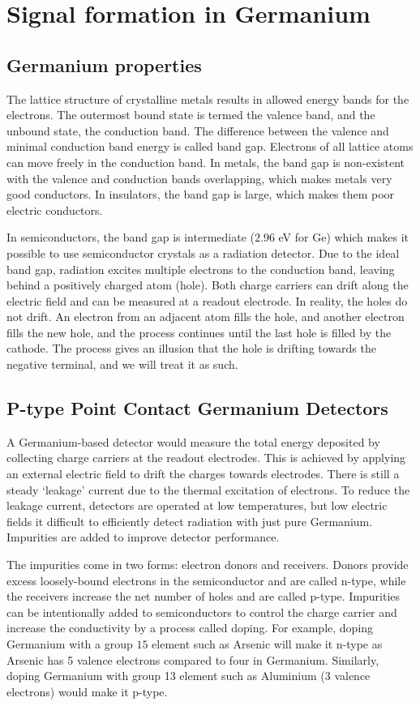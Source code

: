\section{Signal formation in Germanium}
\subsection{Germanium properties}
The lattice structure of crystalline metals results in allowed energy bands for the electrons. The outermost bound state is termed the valence band, and the unbound state, the conduction band. The difference between the valence and minimal conduction band energy is called band gap. Electrons of all lattice atoms can move freely in the conduction band. In metals, the band gap is non-existent with the valence and conduction bands overlapping, which makes metals very good conductors. In insulators, the band gap is large, which makes them poor electric conductors.

In semiconductors, the band gap is intermediate ($2.96$ eV for Ge) which makes it possible to use semiconductor crystals as a radiation detector. Due to the ideal band gap, radiation excites multiple electrons to the conduction band, leaving behind a positively charged atom (hole). Both charge carriers can drift along the electric field and can be measured at a readout electrode. In reality, the holes do not drift. An electron from an adjacent atom fills the hole, and another electron fills the new hole, and the process continues until the last hole is filled by the cathode. The process gives an illusion that the hole is drifting towards the negative terminal, and we will treat it as such.

\subsection{P-type Point Contact Germanium Detectors}
A Germanium-based detector would measure the total energy deposited by collecting charge carriers at the readout electrodes. This is achieved by applying an external electric field to drift the charges towards electrodes. There is still a steady `leakage' current due to the thermal excitation of electrons. To reduce the leakage current, detectors are operated at low temperatures, but low electric fields it difficult to efficiently detect radiation with just pure Germanium. Impurities are added to improve detector performance.

The impurities come in two forms: electron donors and receivers. Donors provide excess loosely-bound electrons in the semiconductor and are called n-type, while the receivers increase the net number of holes and are called p-type. Impurities can be intentionally added to semiconductors to control the charge carrier and increase the conductivity by a process called doping. For example, doping Germanium with a group $15$ element such as Arsenic will make it n-type as Arsenic has 5 valence electrons compared to four in Germanium. Similarly, doping Germanium with group 13 element such as Aluminium (3 valence electrons) would make it p-type.

